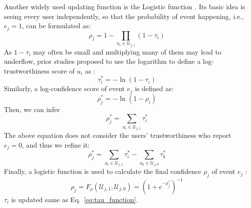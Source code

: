 Another widely used updating function is the Logistic function \citep{yin2008truth}. Its basic idea is seeing every user independently, so that the probability of event happening, i.e., $e_j=1$, can be formulated as:
\begin{equation}
	\rho_j = 1 - \prod_{u_i \in \mathcal U_{j,1}} (1-\tau_i)
\end{equation}
As $1-\tau_i$ may often be small and multiplying many of them may lead to underflow, prior studies proposed to use the logarithm to define a log-trustworthiness score of $u_i$ as \citep{yin2008truth}:
\begin{equation}
	\tau_i^* = - \ln(1-\tau_i)
\end{equation}
Similarly, a log-confidence score of event $e_j$ is defined as:
\begin{equation}
	\rho_j^* = - \ln(1-\rho_i)
\end{equation}
Then, we can infer
\begin{equation}
	\rho_j^* = \sum_{u_i \in \mathcal U_{j,1}} \tau_i^*
\end{equation}
The above equation does not consider the users' trustworthiness who report $e_j=0$, and thus we refine it:
\begin{equation}
	\rho_j^* = \sum_{u_i \in \mathcal U_{j,1}} \tau_i^* - \sum_{u_k \in \mathcal U_{j,0}} \tau_k^*
\end{equation}
Finally, a logistic function is used to calculate the final confidence $\rho_j$ of event $e_j$ \citep{yin2008truth}:
\begin{equation}
	\rho_j = F_\rho(\mathcal U_{j,1}, \mathcal U_{j,0}) = (1+e^{-\rho_j^*})^{-1}
	\label{eq:rho_function_log}
\end{equation}
$\tau_i$ is updated same as Eq.~\ref{eq:tau_function}. 